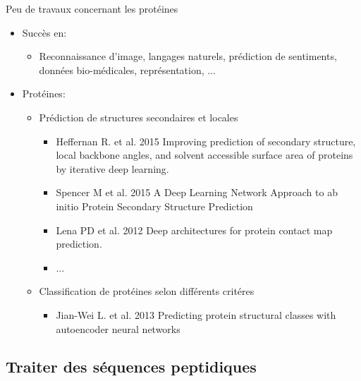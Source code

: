 \documentclass{beamer}
\begin{document}
\begin{frame}{Peu de travaux concernant les protéines}

      \begin{itemize}
      \item Succès en:\pause
        \begin{itemize}
        \item Reconnaissance d'image, langages naturels,
          prédiction de sentiments, données bio-médicales,
          représentation, ...\pause
        \end{itemize}
      \end{itemize}


      \begin{itemize}
      \item Protéines:
        \begin{itemize}
        \item Prédiction de structures secondaires et locales\pause
          \begin{itemize}
          \item Heffernan R. et al. 2015 Improving prediction of secondary
            structure, local backbone angles, and solvent accessible surface
            area of proteins by iterative deep learning. \pause
          \item Spencer M et al. 2015 A Deep Learning Network Approach to ab
            initio Protein Secondary Structure Prediction\pause
          \item Lena PD et al. 2012 Deep architectures for protein contact
            map prediction. \pause
          \item ...\pause
          \end{itemize}
        \item Classification de protéines selon différents critéres\pause
          \begin{itemize}
          \item Jian-Wei L. et al. 2013 Predicting protein structural classes with autoencoder neural networks
          \end{itemize}
        \end{itemize}
      \end{itemize}


\end{frame}

\subsection{Traiter des séquences peptidiques}
\end{document}
